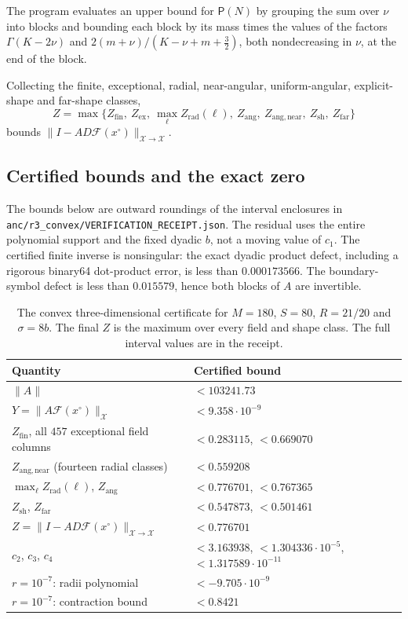 \documentclass[11pt]{amsart}
\theoremstyle{definition}
\theoremstyle{remark}
\numberwithin{equation}{section}
\newcommand{\Fc}{\mathcal{F}}
\newcommand{\nrm}[1]{\lVert #1\rVert}
\begin{document}
The program evaluates an upper bound for $\mathsf P(N)$ by grouping the sum over $\nu$ into blocks and bounding each block by its mass times the values of the factors $\Gamma(K-2\nu)$ and $2(m+\nu)/(K-\nu+m+\frac32)$, both nondecreasing in $\nu$, at the end of the block.

Collecting the finite, exceptional, radial, near-angular, uniform-angular, explicit-shape and far-shape classes,
\[
Z=\max\big\{Z_{\mathrm{fin}},\ Z_{\mathrm{ex}},\ \max_{\ell}Z_{\mathrm{rad}}(\ell),\ Z_{\mathrm{ang}},\ Z_{\mathrm{ang,near}},\ Z_{\mathrm{sh}},\ Z_{\mathrm{far}}\big\}
\]
bounds $\nrm{I-AD\Fc(x^\circ)}_{\mathcal X\to\mathcal X}$.

\subsection{Certified bounds and the exact zero}\label{r3:sec-zero}
The bounds below are outward roundings of the interval enclosures in \texttt{anc/r3\_convex/VERIFICATION\_RECEIPT.json}. The residual uses the entire polynomial support and the fixed dyadic $b$, not a moving value of $c_1$. The certified finite inverse is nonsingular: the exact dyadic product defect, including a rigorous binary64 dot-product error, is less than $0.000173566$. The boundary-symbol defect is less than $0.015579$, hence both blocks of $A$ are invertible.

\begin{table}[ht]
\centering\footnotesize
\begin{tabular}{@{}ll@{}}
\toprule
Quantity & Certified bound\\
\midrule
$\nrm A$ & $<103241.73$\\
$Y=\nrm{A\Fc(x^\circ)}_{\mathcal X}$ & $<9.358\cdot10^{-9}$\\
$Z_{\mathrm{fin}}$, all $457$ exceptional field columns & $<0.283115$, $<0.669070$\\
$Z_{\mathrm{ang,near}}$ (fourteen radial classes) & $<0.559208$\\
$\max_\ell Z_{\mathrm{rad}}(\ell)$, $Z_{\mathrm{ang}}$ & $<0.776701$, $<0.767365$\\
$Z_{\mathrm{sh}}$, $Z_{\mathrm{far}}$ & $<0.547873$, $<0.501461$\\
$Z=\nrm{I-AD\Fc(x^\circ)}_{\mathcal X\to\mathcal X}$ & $<0.776701$\\
$c_2$, $c_3$, $c_4$ & $<3.163938$, $<1.304336\cdot10^{-5}$, $<1.317589\cdot10^{-11}$\\
$r=10^{-7}$: radii polynomial & $<-9.705\cdot10^{-9}$\\
$r=10^{-7}$: contraction bound & $<0.8421$\\
\bottomrule
\end{tabular}
\caption{The convex three-dimensional certificate for $M=180$, $S=80$, $R=21/20$ and $\sigma=8b$. The final $Z$ is the maximum over every field and shape class. The full interval values are in the receipt.}
\label{r3:tab-bounds}
\end{table}
\end{document}

